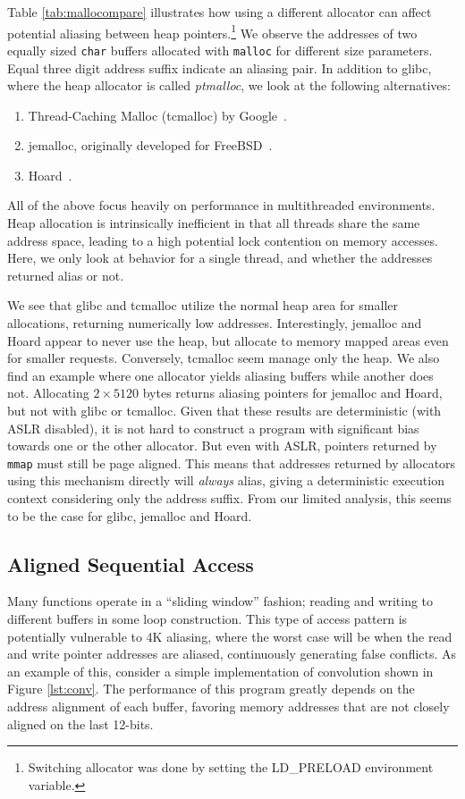 \documentclass{acm_proc_article-sp}
\begin{document}
Table \ref{tab:mallocompare} illustrates how using a different allocator can affect potential aliasing between heap pointers.\footnote{Switching allocator was done by setting the LD\_PRELOAD environment variable.}
We observe the addresses of two equally sized \texttt{char} buffers allocated with \texttt{malloc} for different size parameters.
Equal three digit address suffix indicate an aliasing pair.
In addition to glibc, where the heap allocator is called \emph{ptmalloc}, we look at the following alternatives:
\begin{enumerate}
  \item Thread-Caching Malloc (tcmalloc) by Google~\cite{TCMalloc}.
  \item jemalloc, originally developed for FreeBSD~\cite{JEMalloc}.
  \item Hoard~\cite{Berger:2000:Hoard}.
\end{enumerate}
All of the above focus heavily on performance in multithreaded environments.
Heap allocation is intrinsically inefficient in that all threads share the same address space, leading to a high potential lock contention on memory accesses.
Here, we only look at behavior for a single thread, and whether the addresses returned alias or not.

We see that glibc and tcmalloc utilize the normal heap area for smaller allocations, returning numerically low addresses. %
Interestingly, jemalloc and Hoard appear to never use the heap, but allocate to memory mapped areas even for smaller requests.
Conversely, tcmalloc seem manage only the heap.
We also find an example where one allocator yields aliasing buffers while another does not.
Allocating $2 \times 5120$ bytes returns aliasing pointers for jemalloc and Hoard, but not with glibc or tcmalloc.
Given that these results are deterministic (with ASLR disabled), it is not hard to construct a program with significant bias towards one or the other allocator.
But even with ASLR, pointers returned by \texttt{mmap} must still be page aligned.
This means that addresses returned by allocators using this mechanism directly will \emph{always} alias, giving a deterministic execution context considering only the address suffix.
From our limited analysis, this seems to be the case for glibc, jemalloc and Hoard.


\subsection{Aligned Sequential Access}
Many functions operate in a ``sliding window'' fashion; reading and writing to different buffers in some loop construction.
This type of access pattern is potentially vulnerable to 4K aliasing, where the worst case will be when the read and write pointer addresses are aliased, continuously generating false conflicts.
As an example of this, consider a simple implementation of convolution shown in Figure \ref{lst:conv}.
The performance of this program greatly depends on the address alignment of each buffer, favoring memory addresses that are not closely aligned on the last 12-bits.
\end{document}
